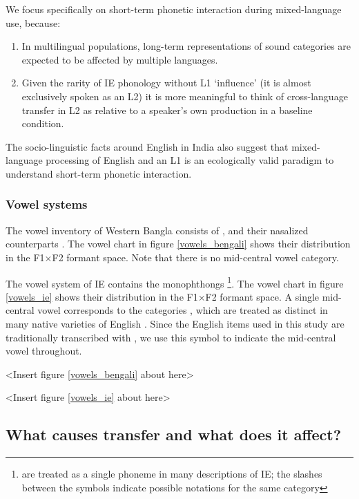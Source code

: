 \documentclass[12 pt]{article}
\newcommand{\nt}[1]{\textipa{[#1]}} %
\begin{document}
We focus specifically on short-term phonetic interaction during mixed-language use, because:

\begin{enumerate}[label=(\roman*)]
	\item In multilingual populations, long-term representations of sound categories are expected to be affected by multiple languages. 
	\item Given the rarity of IE phonology without L1 `influence' (it is almost exclusively spoken as an L2) it is more meaningful to think of cross-language transfer in L2 as relative to a speaker's own production in a baseline condition.
\end{enumerate}

The socio-linguistic facts around English in India also suggest that mixed-language processing of English and an L1 is an ecologically valid paradigm to understand short-term phonetic interaction.

\subsubsection*{Vowel systems} \label{vowel systems}
The vowel inventory of Western Bangla consists of \nt{i, e, \ae, a, O, o, u}, and their nasalized counterparts \citep{garry2001facts}. The vowel chart in figure \ref{vowels_bengali} shows their distribution in the F1$\times$F2 formant space. Note that there is no mid-central vowel category. 


The vowel system of IE contains the monophthongs \nt{I, i, E, e, \ae, @/2/3:, a:, O, o, U, u} \citep{wells1982accents, masica1972sound}\footnote{\nt{@, 2, and 3:} are treated as a single phoneme in many descriptions of IE; the slashes between the symbols indicate possible notations for the same category}. The vowel chart in figure \ref{vowels_ie} shows their distribution in the F1$\times$F2 formant space. 
A single mid-central vowel corresponds to the categories \nt{2,@,3:}, which are treated as distinct in many native varieties of English \citep{nihalani1979indian,wells1982accents,hickey2005legacies,bansal1969intelligibility}. Since the English items used in this study are traditionally transcribed with \nt{2}, we use this symbol to indicate the mid-central vowel throughout. 
 
<Insert figure \ref{vowels_bengali} about here>

<Insert figure \ref{vowels_ie} about here>

\subsection{What causes transfer and what does it affect?}\label{causes}
\end{document}
